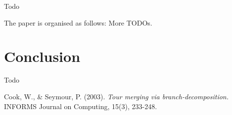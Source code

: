 \documentclass[12pt]{article}
\begin{document}
Todo

The paper is organised as follows: More TODOs.



%
%
\section{Conclusion}
\label{sec:conclusion}
Todo



%
%
\begin{thebibliography}{9}
        Cook, W., & Seymour, P. (2003).
        \emph{Tour merging via branch-decomposition.}
        INFORMS Journal on Computing, 15(3), 233-248.

\end{thebibliography}
\end{document}
